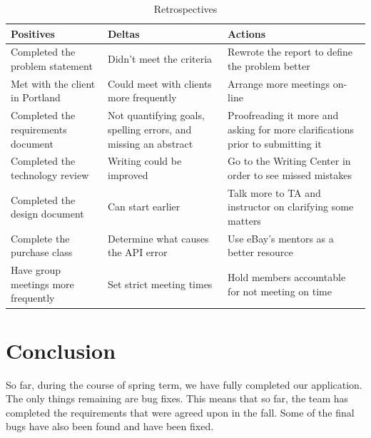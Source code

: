 \documentclass[journal,compsoc, 10pt, draftclsnofoot, onecolumn]{IEEEtran}
\begin{document}
\begin{table}[!ht]
\centering
\caption{Retrospectives}
\label{my-label}
\begin{tabularx}{\textwidth}{X|X|X}
\hline
\textbf{Positives} & \textbf{Deltas} & \textbf{Actions} \\ \hline
Completed the problem statement                  &  Didn't meet the criteria                &Rewrote the report to define the problem better                 \\ \hline
Met with the client in Portland                  &     Could meet with clients more frequently            & Arrange more meetings on-line                 \\ \hline
Completed the requirements document                  & Not quantifying goals, spelling errors, and missing an abstract                & Proofreading it more and asking for more clarifications prior to submitting it                 \\ \hline
Completed the technology review                 & Writing could be improved                & Go to the Writing Center in order to see missed mistakes                 \\ \hline
Completed the design document                  & Can start earlier                 &Talk more to TA and instructor on clarifying some matters                  \\ \hline
Complete the purchase class                       & Determine what causes the API error       & Use eBay's mentors as a better resource \\ \hline
Have group meetings more frequently        & Set strict meeting times                             & Hold members accountable for not meeting on time \\ \hline
\end{tabularx}
\end{table}

\FloatBarrier
\section{Conclusion}
So far, during the course of spring term, we have fully completed our application. 
The only things remaining are bug fixes. This means that so far, the team has completed
the requirements that were agreed upon in the fall. Some of the final bugs have also 
been found and have been fixed. 
 
\end{document}
